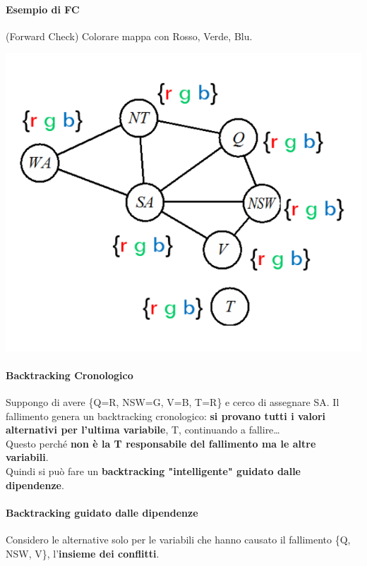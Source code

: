 \documentclass[10pt]{book}
\begin{document}
\paragraph{Esempio di FC} (Forward Check) Colorare mappa con Rosso, Verde, Blu.
\begin{center}
	\includegraphics[scale=0.7]{FC_es1.png}
\end{center}
\paragraph{Backtracking Cronologico}
Suppongo di avere \{Q=R, NSW=G, V=B, T=R\} e cerco di assegnare SA. Il fallimento genera un backtracking cronologico: \textbf{si provano tutti i valori alternativi per l'ultima variabile}, T, continuando a fallire\ldots\\
Questo perché \textbf{non è la T responsabile del fallimento ma le altre variabili}.\\
Quindi si può fare un \textbf{backtracking "intelligente" guidato dalle dipendenze}.
%
\paragraph{Backtracking guidato dalle dipendenze} Considero le alternative solo per le variabili che hanno causato il fallimento \{Q, NSW, V\}, l'\textbf{insieme dei conflitti}.
\end{document}
